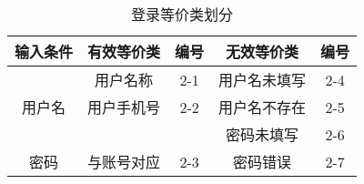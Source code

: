 \documentclass[UTF8,14pt]{article}
\numberwithin{figure}{subsubsection}
\numberwithin{table}{subsubsection}
\begin{document}
\begin{table}[H]
	\centering
	\begin{tabular}{|c|c|c|c|c|}
		\hline
		输入条件                 & 有效等价类                   & 编号                  & 无效等价类   & 编号 \\ \hline
		                         & 用户名称                     & 2-1                   & 用户名未填写 & 2-4  \\ \cline{2-5}
		\multirow{-2}{*}{用户名} & 用户手机号                   & 2-2                   & 用户名不存在 & 2-5  \\ \hline
		                         &                              &                       & 密码未填写   & 2-6  \\ \cline{4-5}
		\multirow{-2}{*}{密码}   & \multirow{-2}{*}{与账号对应} & \multirow{-2}{*}{2-3} & 密码错误     & 2-7  \\ \hline
	\end{tabular}
	\caption{登录等价类划分}
\end{table}
\end{document}
